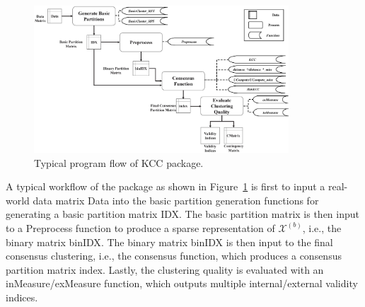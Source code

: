 \documentclass[10pt]{acmtrans2e}
\newcommand{\KCC}{\textsf{KCC}\xspace} %
\begin{document}
\begin{figure}[!bt]
\centering
\includegraphics[width=0.85\textwidth]{fig/soft.eps}
\caption{Typical program flow of \KCC package.}\label{fig:soft} %
\end{figure}


A typical workflow of the package as shown in Figure~\ref{fig:soft} is first to input a real-world data matrix \textsf{Data} into the basic partition generation functions for generating a basic partition matrix \textsf{IDX}. The basic partition matrix is then input to a \textsf{Preprocess} function to produce a sparse representation of $\mathcal{X}^{(b)}$, i.e., the binary matrix \textsf{binIDX}. The binary matrix \textsf{binIDX} is then input to the final consensus clustering, i.e., the consensus function, which produces a consensus partition matrix \textsf{index}. Lastly, the clustering quality is evaluated with an \textsf{inMeasure}/\textsf{exMeasure} function, which outputs multiple internal/external validity indices.
\end{document}
